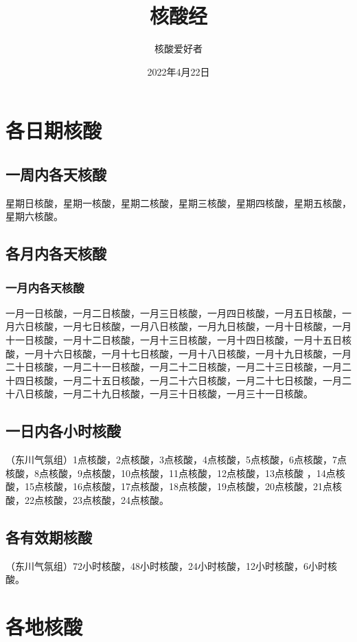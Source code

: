 \documentclass{ctexbook}
\title{核酸经}
\author{核酸爱好者}
\date{2022年4月22日}
\begin{document}
\maketitle

\tableofcontents

\chapter{各日期核酸}

\section{一周内各天核酸}
星期日核酸，星期一核酸，星期二核酸，星期三核酸，星期四核酸，星期五核酸，星期六核酸。

\section{各月内各天核酸}

\subsection{一月内各天核酸}
一月一日核酸，一月二日核酸，一月三日核酸，一月四日核酸，一月五日核酸，一月六日核酸，一月七日核酸，一月八日核酸，一月九日核酸，一月十日核酸，一月十一日核酸，一月十二日核酸，一月十三日核酸，一月十四日核酸，一月十五日核酸，一月十六日核酸，一月十七日核酸，一月十八日核酸，一月十九日核酸，一月二十日核酸，一月二十一日核酸，一月二十二日核酸，一月二十三日核酸，一月二十四日核酸，一月二十五日核酸，一月二十六日核酸，一月二十七日核酸，一月二十八日核酸，一月二十九日核酸，一月三十日核酸，一月三十一日核酸。

\section{一日内各小时核酸}
（东川气氛组）1点核酸，2点核酸，3点核酸，4点核酸，5点核酸，6点核酸，7点核酸，8点核酸，9点核酸，10点核酸，11点核酸，12点核酸，13点核酸 ，14点核酸，15点核酸，16点核酸，17点核酸，18点核酸，19点核酸，20点核酸，21点核酸，22点核酸，23点核酸，24点核酸。

\section{各有效期核酸}
（东川气氛组）72小时核酸，48小时核酸，24小时核酸，12小时核酸，6小时核酸。

\chapter{各地核酸}
\end{document}
